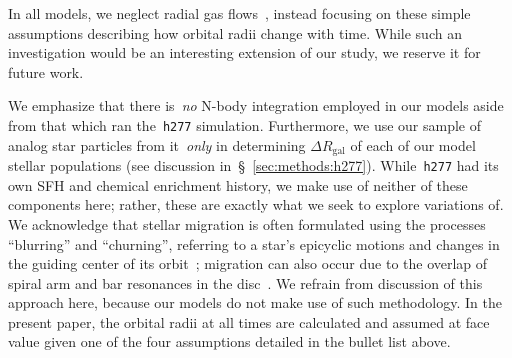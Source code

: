 \documentclass[fleqn, usenatbib]{mnras}
\begin{document}
In all models, we neglect radial gas flows~\citep{Lacey1985, Bilitewski2012}, 
instead focusing on these simple assumptions describing how orbital radii 
change with time. While such an investigation would be an interesting extension 
of our study, we reserve it for future work. 
\par 
We emphasize that there is~\textit{no} N-body integration employed in our 
models aside from that which ran the~\texttt{h277} simulation. Furthermore, we 
use our sample of analog star particles from it~\textit{only} in determining 
$\Delta R_\text{gal}$ of each of our model stellar populations (see discussion 
in~\S~\ref{sec:methods:h277}). While~\texttt{h277} had its own SFH and chemical 
enrichment history, we make use of neither of these components here; rather, 
these are exactly what we seek to explore variations of. We acknowledge that 
stellar migration is often formulated using the processes ``blurring'' and 
``churning'', referring to a star's epicyclic motions and changes in the 
guiding center of its orbit~\citep[e.g.][]{Sellwood2002, Schoenrich2009, 
Minchev2011}; migration can also occur due to the overlap of spiral arm and 
bar resonances in the disc~\citep{Minchev2011}. We refrain from discussion of 
this approach here, because our models do not make use of such methodology. In 
the present paper, the orbital radii at all times are calculated and assumed at 
face value given one of the four assumptions detailed in the bullet list above. 
\par 
\end{document}

